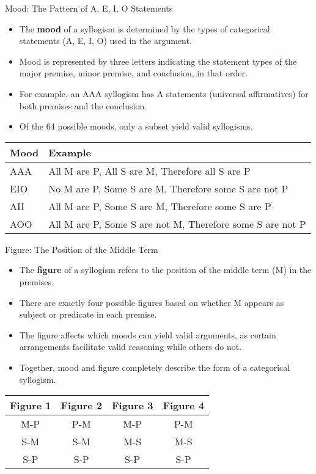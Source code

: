 \documentclass{beamer}
\begin{document}
	\begin{frame}{Mood: The Pattern of A, E, I, O Statements}
		\begin{itemize}
			\item The \textbf{mood} of a syllogism is determined by the types of categorical statements (A, E, I, O) used in the argument.
			\item Mood is represented by three letters indicating the statement types of the major premise, minor premise, and conclusion, in that order.
			\item For example, an AAA syllogism has A statements (universal affirmatives) for both premises and the conclusion.
			\item Of the 64 possible moods, only a subset yield valid syllogisms.
		\end{itemize}
		
		\begin{center}
			\begin{tabular}{|l|l|}
				\hline
				\textbf{Mood} & \textbf{Example} \\
				\hline
				AAA & All M are P, All S are M, Therefore all S are P \\
				EIO & No M are P, Some S are M, Therefore some S are not P \\
				AII & All M are P, Some S are M, Therefore some S are P \\
				AOO & All M are P, Some S are not M, Therefore some S are not P \\
				\hline
			\end{tabular}
		\end{center}
	\end{frame}
	
	\begin{frame}{Figure: The Position of the Middle Term}
		\begin{itemize}
			\item The \textbf{figure} of a syllogism refers to the position of the middle term (M) in the premises.
			\item There are exactly four possible figures based on whether M appears as subject or predicate in each premise.
			\item The figure affects which moods can yield valid arguments, as certain arrangements facilitate valid reasoning while others do not.
			\item Together, mood and figure completely describe the form of a categorical syllogism.
		\end{itemize}
		
		\begin{center}
			\begin{tabular}{|c|c|c|c|}
				\hline
				\textbf{Figure 1} & \textbf{Figure 2} & \textbf{Figure 3} & \textbf{Figure 4} \\
				\hline
				M-P & P-M & M-P & P-M \\
				S-M & S-M & M-S & M-S \\
				S-P & S-P & S-P & S-P \\
				\hline
			\end{tabular}
		\end{center}
	\end{frame}
	
\end{document}

